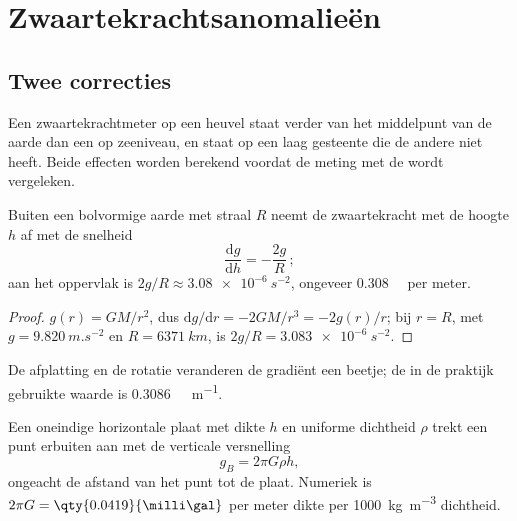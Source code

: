 \section{Zwaartekrachtsanomalieën}

\subsection*{Twee correcties}

Een zwaartekrachtmeter op een heuvel staat verder van het middelpunt van de aarde dan een op zeeniveau, en staat op een laag gesteente die de andere niet heeft. Beide effecten worden berekend voordat de meting met de  wordt vergeleken.

\begin{proposition}\label{prop:b1:isostasy-gravity:free-air}
Buiten een bolvormige aarde met straal $R$ neemt de zwaartekracht met de hoogte $h$ af met de snelheid
\[
  \frac{\mathrm dg}{\mathrm dh} = -\frac{2g}{R}\,;
\]
aan het oppervlak is $2g/R \approx \qty{3.08e-6}{s^{-2}}$, ongeveer \qty{0.308}{\milli\gal} per meter.
\end{proposition}

\begin{proof}
$g(r) = GM/r^2$, dus $\mathrm dg/\mathrm dr = -2GM/r^3 = -2g(r)/r$; bij $r = R$,
met $g = \qty{9.820}{m.s^{-2}}$ en $R = \qty{6371}{km}$, is $2g/R =
\qty{3.083e-6}{s^{-2}}$.
\end{proof}

De afplatting en de rotatie veranderen de gradiënt een beetje; de in de praktijk gebruikte waarde is \qty{0.3086}{\milli\gal.m^{-1}}.

\begin{proposition}\label{prop:b1:isostasy-gravity:slab}
Een oneindige horizontale plaat met dikte $h$ en uniforme dichtheid $\rho$ trekt een punt erbuiten aan met de verticale versnelling
\[
  g_B = 2\pi G\rho h ,
\]
ongeacht de afstand van het punt tot de plaat. Numeriek is $2\pi G =
\qty{0.0419}{\milli\gal}$ per meter dikte per \qty{1000}{kg.m^{-3}} dichtheid.
\end{proposition}

